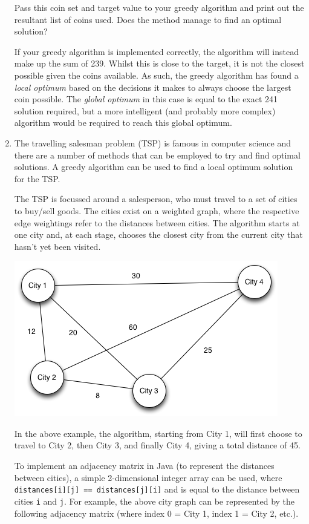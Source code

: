 \documentclass[11pt,a4paper]{report}
\begin{document}
\begin{enumerate}
    Pass this coin set and target value to your greedy algorithm and print out the resultant list of coins used. Does the method manage to find an optimal solution? 

    If your greedy algorithm is implemented correctly, the algorithm will instead make up the sum of 239. Whilst this is close to the target, it is not the closest possible given the coins available. As such, the greedy algorithm has found a \textit{local optimum} based on the decisions it makes to always choose the largest coin possible. The \textit{global optimum} in this case is equal to the exact 241 solution required, but a more intelligent (and probably more complex) algorithm would be required to reach this global optimum.

\item The travelling salesman problem (TSP) is famous in computer science and there are a number of methods that can be employed to try and find optimal solutions. A greedy algorithm can be used to find a local optimum solution for the TSP.

    The TSP is focussed around a salesperson, who must travel to a set of cities to buy/sell goods. The cities exist on a weighted graph, where the respective edge weightings refer to the distances between cities. The algorithm starts at one city and, at each stage, chooses the closest city from the current city that hasn't yet been visited.

    \begin{center}
    \includegraphics[width=.6\textwidth]{media/tsp1.png}
    \end{center}

    In the above example, the algorithm, starting from City 1, will first choose to travel to City 2, then City 3, and finally City 4, giving a total distance of 45.

    To implement an adjacency matrix in Java (to represent the distances between cities), a simple 2-dimensional integer array can be used, where \texttt{distances[i][j] == distances[j][i]} and is equal to the distance between cities \texttt{i} and \texttt{j}. For example, the above city graph can be represented by the following adjacency matrix (where index 0 = City 1, index 1 = City 2, etc.).


\end{enumerate}
\end{document}
